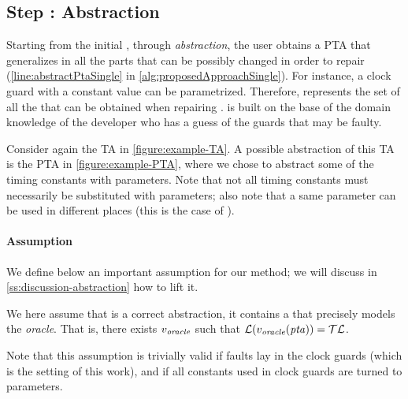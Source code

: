 \begin{tikzborder}{\cite{Gargantini16:validation}}
\begin{tikzborder}{\cite{gargantini_combinatorial_2017}}
\begin{tikzborder}{\cite{garn2019}}
\begin{tikzborder}{\cite{arcaini2019achieving}}
\begin{tikzborder}{\cite{arcaini2019varivolution}}
\subsection{Step : Abstraction}\label{sec:abstraction}

\begin{tikzborder}{}
Starting from the initial \initTa, through \emph{abstraction}, the user obtains a PTA \ptaProc that generalizes \initTa in all the parts that can be possibly changed in order to repair \initTa (\ref{line:abstractPtaSingle} in \ref{alg:proposedApproachSingle}). For instance, a clock guard with a constant value can be parametrized. Therefore, \ptaProc represents the set of all the \tas that can be obtained when repairing \initTa. \ptaProc is built on the base of the domain knowledge of the developer who has a guess of the guards that may be faulty. 

\begin{example}
	Consider again the TA in \ref{figure:example-TA}.
	A possible abstraction of this TA is the PTA in \ref{figure:example-PTA}, where we chose to abstract some of the timing constants with parameters.
	Note that not all timing constants must necessarily be substituted with parameters; also note that a same parameter can be used in different places (this is the case of ).
\end{example}

\paragraph{Assumption}
We define below an important assumption for our method; we will discuss in \ref{ss:discussion-abstraction} how to lift it.

\begin{assumption}\label{assumption:oracle-in-pta}
	We here assume that \ptaProc is a correct abstraction, \ie{} it contains a \ta that precisely models the {\it oracle}.
	That is, there exists $v_{\mathit{oracle}}$ such that $\mathcal{L}(v_{\mathit{oracle}}(\mathit{pta})) = \mathcal{TL}$.
\end{assumption}

Note that this assumption is trivially valid if faults lay in the clock guards (which is the setting of this work), and if all constants used in clock guards are turned to parameters.
\end{tikzborder}


\end{tikzborder}
\end{tikzborder}
\end{tikzborder}
\end{tikzborder}
\end{tikzborder}
